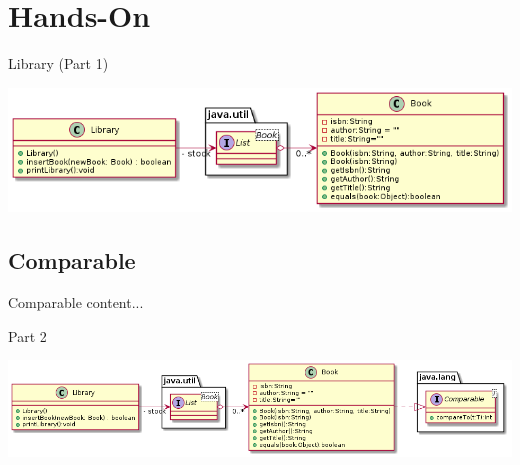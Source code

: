 \section{Hands-On}
\begin{frame}[fragile]{Library (Part 1)}
	
	\begin{center}
		\includegraphics[width=\textwidth]{07_collection/hands_on_01.png}
	\end{center}

	
\end{frame}
\subsection{Comparable}
\begin{frame}{Comparable}
	content...
\end{frame}
\begin{frame}{Part 2}

		\begin{center}
		\includegraphics[width=\textwidth]{07_collection/hands_on_02.png}
		\end{center}

\end{frame}
